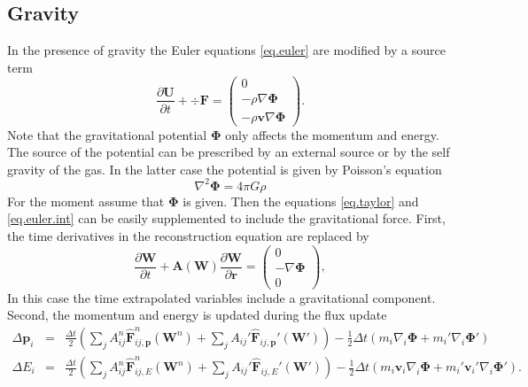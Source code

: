 \subsection{Gravity}
\label{sec.gravity}
In the presence of gravity the Euler equations \ref{eq.euler} are modified by
a source term
%
\begin{equation}
    \frac{\partial \mathbf{U}}{\partial t} + \div \mathbf{F} =\left( 
    \begin{array}{c}
    	0 \\
        -\rho\nabla\mathbf{\Phi} \\
        -\rho\mathbf{v}\nabla\mathbf{\Phi}
    \end{array}\right).
\end{equation}
%
Note that the gravitational potential $\mathbf{\Phi}$ only affects the
momentum and energy. The source of the potential can be prescribed by
an external source or by the self gravity of the gas. In the latter case
the potential is given by Poisson's equation
%
\begin{equation}
	\label{eq.poisson}
	\nabla^2\mathbf{\Phi} = 4\pi G\rho
\end{equation}
For the moment assume that $\mathbf{\Phi}$ is given. Then the equations
\ref{eq.taylor} and \ref{eq.euler.int} can be easily supplemented to
include the gravitational force. First, the time derivatives in the
reconstruction equation are replaced by
%
\begin{equation}
	\label{eq.primitive.gravity}
    \frac{\partial\mathbf{W}}{\partial t}  + \mathbf{A}
    	\left(\mathbf{W}\right)\frac{\partial\mathbf{W}}{\partial\mathbf{r}}
        = \left(
        	\begin{array}{c}
            0 \\
            -\nabla\mathbf{\Phi} \\
            0
            \end{array}
         \right),
\end{equation}
%
In this case the time extrapolated variables include a gravitational
component. Second, the momentum and energy is updated during the flux update
%
\begin{equation}
	\label{eq.gravity.update}
	\begin{array}{rcl}
        \Delta\mathbf{p}_i & = &
        	\frac{\Delta t}{2}\left(\sum_j A_{ij}^n\mathbf{\hat{F}}_{ij,\mathbf{p}}^n
            (\mathbf{W}^n) + \sum_j A_{ij}'\mathbf{\hat{F}}_{ij,\mathbf{p}}'
            (\mathbf{W}')\right) - \frac{1}{2}\Delta t\left( 
        	m_i\nabla_i\mathbf{\Phi} + m_i'\nabla_i\mathbf{\Phi}'\right)\\
        \Delta E_i & = &
        	\frac{\Delta t}{2}\left(\sum_j A_{ij}^n\mathbf{\hat{F}}_{ij,E}^n
            (\mathbf{W}^n) + \sum_j A_{ij}'\mathbf{\hat{F}}_{ij,E}'
            (\mathbf{W}')\right) - \frac{1}{2}\Delta t\left( 
        	m_i\mathbf{v}_i\nabla_i\mathbf{\Phi} +
            m_i'\mathbf{v}_i'\nabla_i\mathbf{\Phi}'\right).\\
    \end{array}
\end{equation}
%
